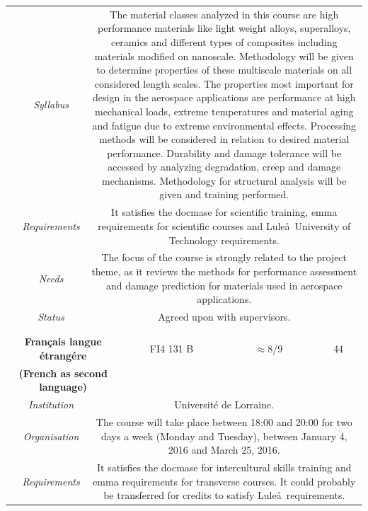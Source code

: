 \documentclass[a4paper, twoside,12pt, abstract]{scrartcl} %
\begin{document}
\begin{center}
\begin{longtable}{cccccc}
    &\textit{Syllabus}&\multicolumn{4}{p{0.7\textwidth}}{The material classes analyzed in this course are high performance materials like light weight alloys, superalloys, ceramics and different types of composites including materials modified on nanoscale. Methodology will be given to determine properties of these multiscale materials on all considered length scales. The properties most important for design in the aerospace applications are performance at high mechanical loads, extreme temperatures and material aging and fatigue due to extreme environmental effects. Processing methods will be considered in relation to desired material performance. Durability and damage tolerance will be accessed by analyzing degradation, creep and damage mechanisms. Methodology for structural analysis will be given and training performed.}\\
    &\textit{Requirements}&\multicolumn{4}{p{0.7\textwidth}}{It satisfies the \acrshort{docmase} for scientific training, \acrshort{emma} requirements for scientific courses and Lule\aa\ University of Technology requirements.}\\
    &\textit{Needs}&\multicolumn{4}{p{0.7\textwidth}}{The focus of the course is strongly related to the project theme, as it reviews the methods for performance assessment and damage prediction for materials used in aerospace applications.}\\
    &\textit{Status}&\multicolumn{4}{p{0.7\textwidth}}{Agreed upon with supervisors.}\\
    &&&&&\\
    \midrule
    &&&&&\\
   \multicolumn{3}{p{0.5\textwidth}}{\textbf{Français langue \'etrang\'ere}}&FI4 131 B&$\approx8/9$&44\\
   \multicolumn{3}{p{0.5\textwidth}}{\textbf{(French as second language)}}&&&\\
   &\textit{Institution}&\multicolumn{4}{p{0.7\textwidth}}{Universit\'e de Lorraine.}\\
   &\textit{Organisation}&\multicolumn{4}{p{0.7\textwidth}}{The course will take place between 18:00 and 20:00 for two days a week (Monday and Tuesday), between January 4, 2016 and March 25, 2016.}\\
   &\textit{Requirements}&\multicolumn{4}{p{0.7\textwidth}}{It satisfies the \acrshort{docmase} for intercultural skills training and \acrshort{emma} requirements for transverse courses. It could probably be transferred for credits to satisfy Lule\aa\ requirements.}\\

\end{longtable}
\end{center}
\end{document}
